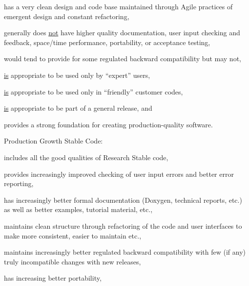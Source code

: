 \documentclass[11pt]{SANDreport}
\begin{document}
\begin{compactenum}
\begin{compactitem}
{}\item has a very clean design and code base maintained through Agile
practices of emergent design and constant refactoring,

{}\item generally does {}\underline{not} have higher quality
documentation, user input checking and feedback, space/time
performance, portability, or acceptance testing,

{}\item would tend to provide for some regulated backward
compatibility but may not,

{}\item {}\underline{is} appropriate to be used only by ``expert''
users,

{}\item {}\underline{is} appropriate to be used only in ``friendly''
customer codes,

{}\item {}\underline{is} appropriate to be part of a general release,
and

{}\item provides a strong foundation for creating production-quality
software.

\end{compactitem}

{}\item Production Growth Stable Code:

\begin{compactitem}

{}\item includes all the good qualities of Research Stable code,

{}\item provides increasingly improved checking of user input errors
and better error reporting,

{}\item has increasingly better formal documentation (Doxygen,
technical reports, etc.) as well as better examples, tutorial
material, etc.,

{}\item maintains clean structure through refactoring of the code and
user interfaces to make more consistent, easier to maintain etc.,

{}\item maintains increasingly better regulated backward compatibility
with few (if any) truly incompatible changes with new releases,

{}\item has increasing better portability,


\end{compactitem}
\end{compactenum}
\end{document}
